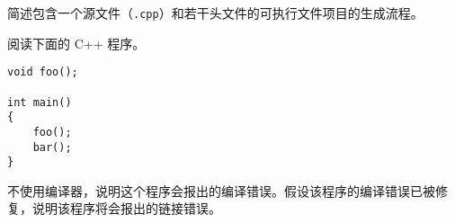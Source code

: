 
\begin{problemset}
	\item 简述包含一个源文件（\lstinline[language={}]{.cpp}）和若干头文件的可执行文件项目的生成流程。

	\item 阅读下面的 C++ 程序。

	\begin{lstlisting}[language={[latest]C++}, moreemph={[2]foo}]
void foo();

int main()
{
	foo();
	bar();
}
	\end{lstlisting}

	不使用编译器，说明这个程序会报出的编译错误。假设该程序的编译错误已被修复，说明该程序将会报出的链接错误。
\end{problemset}
